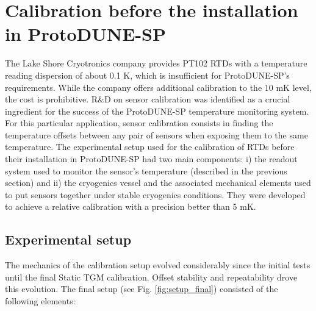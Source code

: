 \section{Calibration before the installation in ProtoDUNE-SP}
\label{sec:old_calib}

\noindent The Lake Shore Cryotronics company provides PT102 RTDs with a temperature reading dispersion of about 0.1 K, which is insufficient for ProtoDUNE-SP's requirements. While the company offers additional calibration to the 10 mK level, the cost is prohibitive. R\&D on sensor calibration was identified as a crucial ingredient for the success of the ProtoDUNE-SP temperature monitoring system. For this particular application, sensor calibration consists in finding the temperature offsets between any pair of sensors when exposing them to the same temperature. The experimental setup used for the calibration of RTDs before their installation in ProtoDUNE-SP had two main components: i) the readout system used to monitor the sensor's temperature (described in the previous section) and ii) the cryogenics vessel and the associated mechanical elements used to put sensors together under stable cryogenics conditions. They were developed to achieve a relative calibration with a precision better than 5 mK. %

\subsection{Experimental setup}
\noindent The mechanics of the calibration setup evolved considerably since the initial tests until the final Static TGM calibration. Offset stability and repeatability drove this evolution. The final setup (see Fig. \ref{fig:setup_final}) consisted of the following elements:

